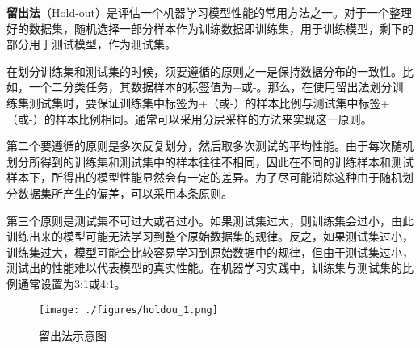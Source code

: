 
\textbf{留出法}（Hold-out）是评估一个机器学习模型性能的常用方法之一。对于一个整理好的数据集，随机选择一部分样本作为训练数据即训练集，用于训练模型，剩下的部分用于测试模型，作为测试集。

在划分训练集和测试集的时候，须要遵循的原则之一是保持数据分布的一致性。比如，一个二分类任务，其数据样本的标签值为+或-。那么，在使用留出法划分训练集测试集时，要保证训练集中标签为+（或-）的样本比例与测试集中标签+（或-）的样本比例相同。通常可以采用分层采样的方法来实现这一原则。

第二个要遵循的原则是多次反复划分，然后取多次测试的平均性能。由于每次随机划分所得到的训练集和测试集中的样本往往不相同，因此在不同的训练样本和测试样本下，所得出的模型性能显然会有一定的差异。为了尽可能消除这种由于随机划分数据集所产生的偏差，可以采用本条原则。

第三个原则是测试集不可过大或者过小。如果测试集过大，则训练集会过小，由此训练出来的模型可能无法学习到整个原始数据集的规律。反之，如果测试集过小，训练集过大，模型可能会比较容易学习到原始数据中的规律，但由于测试集过小，测试出的性能难以代表模型的真实性能。在机器学习实践中，训练集与测试集的比例通常设置为3:1或4:1。


\begin{figure}[ht]
\centering
\texttt{[image: ./figures/holdou\_1.png]}
\caption{留出法示意图} \label{holdou_fig1}
\end{figure}